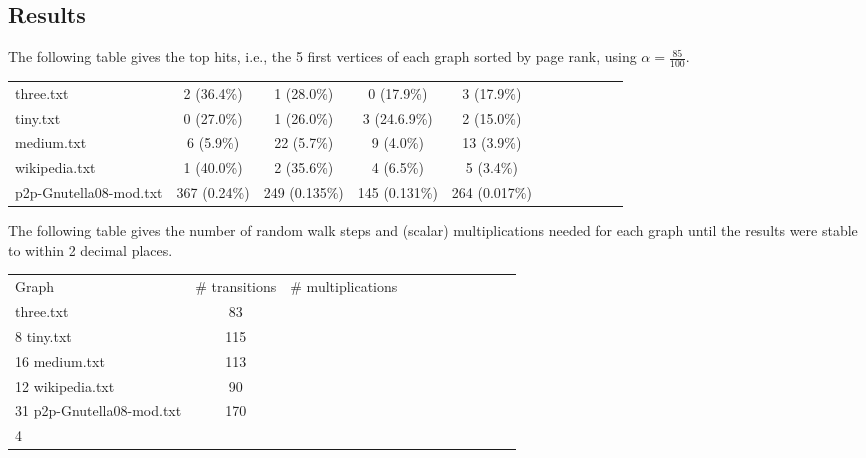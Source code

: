 \documentclass{tufte-handout}
\begin{document}
\subsection{Results}

The following table gives the top hits, i.e., the 5 first vertices of
each graph sorted by page rank, using $\alpha = \frac{85}{100}$.

\medskip
\begin{fullwidth}
\small
\begin{tabular}{lcccccccccc}
three.txt & 2 (36.4\%) & 1 (28.0\%) & 0 (17.9\%) & 3 (17.9\%) \\
tiny.txt & 0 (27.0\%) & 1 (26.0\%) & 3 (24.6.9\%) & 2 (15.0\%) \\
medium.txt & 6 (5.9\%) & 22 (5.7\%) & 9 (4.0\%) & 13 (3.9\%) \\
wikipedia.txt & 1 (40.0\%) & 2 (35.6\%) & 4 (6.5\%) & 5 (3.4\%) \\
p2p-Gnutella08-mod.txt & 367 (0.24\%) & 249 (0.135\%) & 145 (0.131\%) & 264 (0.017\%) \\
\end{tabular}
\end{fullwidth}

\bigskip The following table gives the number of random walk steps and
(scalar) multiplications needed for each graph until the results were
stable to within 2 decimal places.

\medskip
\begin{fullwidth}
\small
\begin{tabular}{lcccccccccc}
Graph & \# transitions  & \# multiplications \\
three.txt & 83 \\8
tiny.txt & 115 \\16
medium.txt & 113 \\12
wikipedia.txt & 90 \\31
p2p-Gnutella08-mod.txt & 170 \\4
\end{tabular}
\end{fullwidth}
\end{document}
